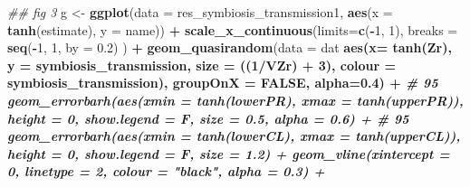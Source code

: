 \documentclass[
]{article}
\newenvironment{Shaded}{\begin{snugshade}}{\end{snugshade}}
\newcommand{\CommentTok}[1]{\textcolor[rgb]{0.56,0.35,0.01}{\textit{#1}}}
\newcommand{\DataTypeTok}[1]{\textcolor[rgb]{0.13,0.29,0.53}{#1}}
\newcommand{\DecValTok}[1]{\textcolor[rgb]{0.00,0.00,0.81}{#1}}
\newcommand{\FloatTok}[1]{\textcolor[rgb]{0.00,0.00,0.81}{#1}}
\newcommand{\KeywordTok}[1]{\textcolor[rgb]{0.13,0.29,0.53}{\textbf{#1}}}
\newcommand{\NormalTok}[1]{#1}
\newcommand{\OperatorTok}[1]{\textcolor[rgb]{0.81,0.36,0.00}{\textbf{#1}}}
\newcommand{\OtherTok}[1]{\textcolor[rgb]{0.56,0.35,0.01}{#1}}
\newcommand{\StringTok}[1]{\textcolor[rgb]{0.31,0.60,0.02}{#1}}
\begin{document}
\begin{Shaded}
\begin{Highlighting}[]
\CommentTok{## fig 3}
\NormalTok{g <-}\StringTok{ }\KeywordTok{ggplot}\NormalTok{(}\DataTypeTok{data =}\NormalTok{ res_symbiosis_transmission1, }\KeywordTok{aes}\NormalTok{(}\DataTypeTok{x =} \KeywordTok{tanh}\NormalTok{(estimate), }\DataTypeTok{y =}\NormalTok{ name)) }\OperatorTok{+}
\StringTok{  }\KeywordTok{scale_x_continuous}\NormalTok{(}\DataTypeTok{limits=}\KeywordTok{c}\NormalTok{(}\OperatorTok{-}\DecValTok{1}\NormalTok{, }\DecValTok{1}\NormalTok{), }\DataTypeTok{breaks =} \KeywordTok{seq}\NormalTok{(}\OperatorTok{-}\DecValTok{1}\NormalTok{, }\DecValTok{1}\NormalTok{, }\DataTypeTok{by =} \FloatTok{0.2}\NormalTok{) ) }\OperatorTok{+}
\StringTok{  }\KeywordTok{geom_quasirandom}\NormalTok{(}\DataTypeTok{data =}\NormalTok{ dat }\OperatorTok{%
                   \KeywordTok{aes}\NormalTok{(}\DataTypeTok{x=} \KeywordTok{tanh}\NormalTok{(Zr), }\DataTypeTok{y =}\NormalTok{ symbiosis_transmission, }\DataTypeTok{size =}\NormalTok{ ((}\DecValTok{1}\OperatorTok{/}\NormalTok{VZr) }\OperatorTok{+}\StringTok{ }\DecValTok{3}\NormalTok{), }\DataTypeTok{colour =}\NormalTok{ symbiosis_transmission), }\DataTypeTok{groupOnX =} \OtherTok{FALSE}\NormalTok{, }\DataTypeTok{alpha=}\FloatTok{0.4}\NormalTok{) }\OperatorTok{+}\StringTok{ }
\StringTok{  }\CommentTok{# 95 %
\StringTok{  }\KeywordTok{geom_errorbarh}\NormalTok{(}\KeywordTok{aes}\NormalTok{(}\DataTypeTok{xmin =} \KeywordTok{tanh}\NormalTok{(lowerPR), }\DataTypeTok{xmax =} \KeywordTok{tanh}\NormalTok{(upperPR)),  }\DataTypeTok{height =} \DecValTok{0}\NormalTok{, }\DataTypeTok{show.legend =}\NormalTok{ F, }\DataTypeTok{size =} \FloatTok{0.5}\NormalTok{, }\DataTypeTok{alpha =} \FloatTok{0.6}\NormalTok{) }\OperatorTok{+}
\StringTok{  }\CommentTok{# 95 %
\StringTok{  }\KeywordTok{geom_errorbarh}\NormalTok{(}\KeywordTok{aes}\NormalTok{(}\DataTypeTok{xmin =} \KeywordTok{tanh}\NormalTok{(lowerCL), }\DataTypeTok{xmax =} \KeywordTok{tanh}\NormalTok{(upperCL)),  }\DataTypeTok{height =} \DecValTok{0}\NormalTok{, }\DataTypeTok{show.legend =}\NormalTok{ F, }\DataTypeTok{size =} \FloatTok{1.2}\NormalTok{) }\OperatorTok{+}
\StringTok{  }\KeywordTok{geom_vline}\NormalTok{(}\DataTypeTok{xintercept =} \DecValTok{0}\NormalTok{, }\DataTypeTok{linetype =} \DecValTok{2}\NormalTok{, }\DataTypeTok{colour =} \StringTok{"black"}\NormalTok{, }\DataTypeTok{alpha =} \FloatTok{0.3}\NormalTok{) }\OperatorTok{+}
}}}
\end{Highlighting}
\end{Shaded}
\end{document}
